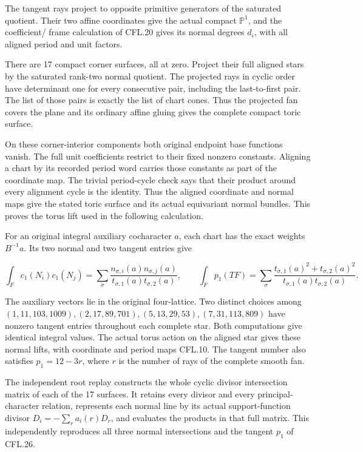 The tangent rays project to opposite primitive generators
of the saturated quotient. Their two affine coordinates
give the actual compact \(\mathbb P^1\), and the coefficient/
frame calculation of CFL.20 gives its normal degrees
\(d_i\), with all aligned period and unit factors.

There are 17 compact corner surfaces, all at zero.
Project their full aligned stars by the saturated
rank-two normal quotient. The projected rays in cyclic
order have determinant one for every consecutive pair,
including the last-to-first pair. The list of those
pairs is exactly the list of chart cones. Thus the
projected fan covers the plane and its ordinary
affine gluing gives the complete compact toric surface.

On these corner-interior components both original endpoint
base functions vanish. The full unit coefficients restrict
to their fixed nonzero constants. Aligning a chart by its
recorded period word carries those constants as part of the
coordinate map. The trivial period-cycle check says that
their product around every alignment cycle is the identity.
Thus the aligned coordinate and normal maps give the stated
toric surface and its actual equivariant normal bundles.
This proves the torus lift used in the following calculation.

For an original integral auxiliary cocharacter \(a\),
each chart has the exact weights \(B^{-1}a\).
Its two normal and two tangent entries give

\[
 \int_F c_1(N_i)c_1(N_j)=
 \sum_\sigma
 \frac{n_{\sigma,i}(a)n_{\sigma,j}(a)}
      {t_{\sigma,1}(a)t_{\sigma,2}(a)},\qquad
 \int_Fp_1(TF)=
 \sum_\sigma
 \frac{t_{\sigma,1}(a)^2+t_{\sigma,2}(a)^2}
      {t_{\sigma,1}(a)t_{\sigma,2}(a)}.
 \tag{CFL.26}
\]

The auxiliary vectors lie in the original four-lattice.
Two distinct choices among
\((1,11,103,1009),(2,17,89,701),(5,13,29,53),(7,31,113,809)\)
have nonzero tangent entries throughout each complete
star. Both computations give identical integral values.
The actual torus action on the aligned star gives these
normal lifts, with coordinate and period maps CFL.10.
The tangent number also satisfies \(p_1=12-3r\), where
\(r\) is the number of rays of the complete smooth fan.

The independent root replay constructs the whole cyclic
divisor intersection matrix of each of the 17 surfaces.
It retains every divisor and every principal-character
relation, represents each normal line by its actual
support-function divisor \(D_i=-\sum_r a_i(r)D_r\), and
evaluates the products in that full matrix. This
independently reproduces all three normal intersections
and the tangent \(p_1\) of CFL.26.

